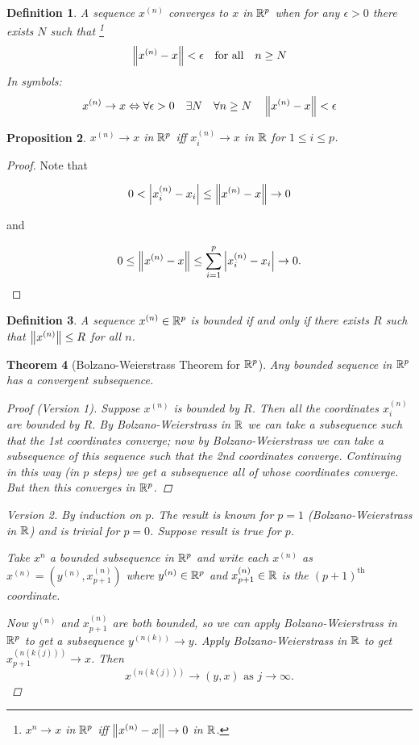 \documentclass{notes}
\theoremstyle{plain}
\newtheorem{proposition}{Proposition}[chapter]
\newtheorem{theorem}[proposition]{Theorem}
\newtheorem{definition}[proposition]{Definition}
\newcommand{\Forall}[1]{\forall #1 \quad}
\newcommand{\Exists}[1]{\exists #1 \quad}
\begin{document}
\begin{definition}
A sequence $ x^{(n)} $ converges to $ x $ in $ \mathbb{R}^{p} $ when for
any $ \epsilon > 0 $ there exists $ N $ such that
\footnote{$ x^{n} \to x $ in $ \mathbb{R}^{p} $ iff $ 
\left\|x^{(n)}-x\right\| \to 0 $ in $ \mathbb{R} $.}
\[ \left\|x^{(n)}-x\right\| < \epsilon \quad \text{for all} \quad n \geq N \]
In symbols:
\[ x^{(n)}\to x \Leftrightarrow \Forall{\epsilon>0}\Exists{N} 
\Forall{n \geq N} \norm{x^{(n)}-x}<\epsilon \]
\end{definition}

\begin{proposition}
$ x^{(n)}\to x $ in $ \mathbb{R}^p $ iff $ 
x_{i}^{(n)}\to x $ in $ \mathbb{R} $ for $ 1 \leq i \leq p $.
\end{proposition}

\begin{proof}
Note that

\[
0 < \left|x_i^{(n)} - x_i\right| \le \left\|x^{(n)} - x\right\| \to 0
\]

and

\[
0 \le \left\|x^{(n)} - x\right\| \le \sum_{i=1}^p \left|x_i^{(n)} - x_i\right| \to 0.
\]

\end{proof}

\begin{definition}
A sequence $ x^{(n)} \in \mathbb{R}^{p} $ is bounded if and only if there 
exists $R$ such that $ \left\|x^{(n)}\right\| \leq R $ for all $ n $.
\end{definition} 

\begin{theorem}[Bolzano-Weierstrass Theorem for $ \mathbb{R}^{p} $]
Any bounded sequence in $ \mathbb{R}^{p} $ has a convergent subsequence.

\begin{proof}[Proof (Version 1)]
Suppose $ x^{(n)} $ is bounded by $ R $. Then all the coordinates $ 
x_{i}^{(n)} $ are bounded by $ R $. By Bolzano-Weierstrass in $ 
\mathbb{R} $ we can take a subsequence such that the 1st coordinates 
converge; now by Bolzano-Weierstrass we can take a subsequence of 
this sequence such that the 2nd coordinates converge. Continuing in 
this way (in $ p $ steps) we get a subsequence all of whose 
coordinates converge. But then this converges in $ \mathbb{R}^{p} $.
\end{proof}

\begin{proof}[Version 2]
By induction on $p$.
The result is known for $ p=1 $ (Bolzano-Weierstrass in $ \mathbb{R} $) 
and is trivial for $ p=0 $.  Suppose result is true for $ p $.

Take $ x^{n} $ a bounded subsequence in $ \mathbb{R}^{p} $ and write each
$ x^{(n)} $ as  $ x^{(n)}=(y^{(n)}, x_{p+1}^{(n)})$
 where $y^{(n)}\in \mathbb{R}^{p}$ and $x_{p+1}^{(n)} \in \mathbb{R}$
is the $ (p+1)^{\text{th}}$ coordinate.

Now $ y^{(n)} $ and $ x_{p+1}^{(n)} $ are both bounded, so we can apply
Bolzano-Weierstrass in $\mathbb{R}^p$ to get a subsequence $y^{(n(k))} \to y$.
Apply Bolzano-Weierstrass in $\mathbb{R}$ to get $x_{p+1}^{(n(k(j)))} \to x$.
Then
\[
x^{(n(k(j)))} \to (y,x) \text{ as } j \to \infty.
\]
\end{proof}
\end{theorem}
\end{document}
